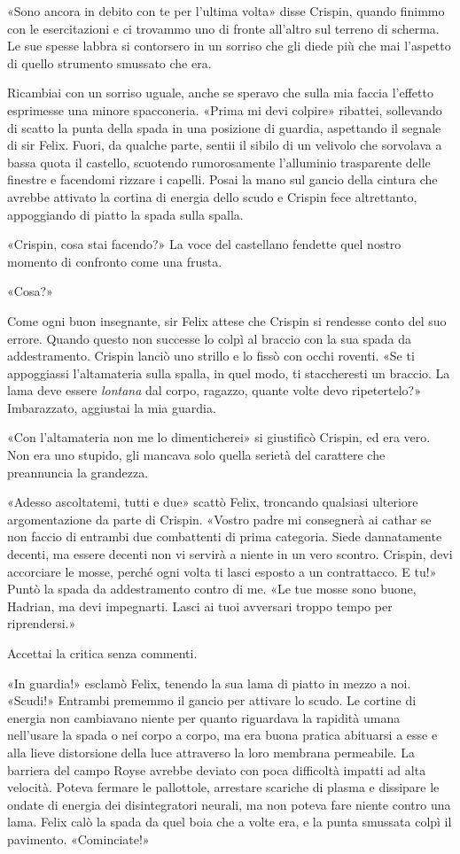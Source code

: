 «Sono ancora in debito con te per l'ultima volta» disse Crispin, quando
finimmo con le esercitazioni e ci trovammo uno di fronte all'altro sul
terreno di scherma. Le sue spesse labbra si contorsero in un sorriso che
gli diede più che mai l'aspetto di quello strumento smussato che era.

Ricambiai con un sorriso uguale, anche se speravo che sulla mia faccia
l'effetto esprimesse una minore spacconeria. «Prima mi devi colpire»
ribattei, sollevando di scatto la punta della spada in una posizione di
guardia, aspettando il segnale di sir Felix. Fuori, da qualche parte,
sentii il sibilo di un velivolo che sorvolava a bassa quota il castello,
scuotendo rumorosamente l'alluminio trasparente delle finestre e
facendomi rizzare i capelli. Posai la mano sul gancio della cintura che
avrebbe attivato la cortina di energia dello scudo e Crispin fece
altrettanto, appoggiando di piatto la spada sulla spalla.

«Crispin, cosa stai facendo?» La voce del castellano fendette quel
nostro momento di confronto come una frusta.

«Cosa?»

Come ogni buon insegnante, sir Felix attese che Crispin si rendesse
conto del suo errore. Quando questo non successe lo colpì al braccio con
la sua spada da addestramento. Crispin lanciò uno strillo e lo fissò con
occhi roventi. «Se ti appoggiassi l'altamateria sulla spalla, in quel
modo, ti staccheresti un braccio. La lama deve essere \emph{lontana} dal
corpo, ragazzo, quante volte devo ripetertelo?» Imbarazzato, aggiustai
la mia guardia.

«Con l'altamateria non me lo dimenticherei» si giustificò Crispin, ed
era vero. Non era uno stupido, gli mancava solo quella serietà del
carattere che preannuncia la grandezza.

«Adesso ascoltatemi, tutti e due» scattò Felix, troncando qualsiasi
ulteriore argomentazione da parte di Crispin. «Vostro padre mi
consegnerà ai cathar se non faccio di entrambi due combattenti di prima
categoria. Siede dannatamente decenti, ma essere decenti non vi servirà
a niente in un vero scontro. Crispin, devi accorciare le mosse, perché
ogni volta ti lasci esposto a un contrattacco. E tu!» Puntò la spada da
addestramento contro di me. «Le tue mosse sono buone, Hadrian, ma devi
impegnarti. Lasci ai tuoi avversari troppo tempo per riprendersi.»

Accettai la critica senza commenti.

«In guardia!» esclamò Felix, tenendo la sua lama di piatto in mezzo a
noi. «Scudi!» Entrambi prememmo il gancio per attivare lo scudo. Le
cortine di energia non cambiavano niente per quanto riguardava la
rapidità umana nell'usare la spada o nei corpo a corpo, ma era buona
pratica abituarsi a esse e alla lieve distorsione della luce attraverso
la loro membrana permeabile. La barriera del campo Royse avrebbe deviato
con poca difficoltà impatti ad alta velocità. Poteva fermare le
pallottole, arrestare scariche di plasma e dissipare le ondate di
energia dei disintegratori neurali, ma non poteva fare niente contro una
lama. Felix calò la spada da quel boia che a volte era, e la punta
smussata colpì il pavimento. «Cominciate!»

